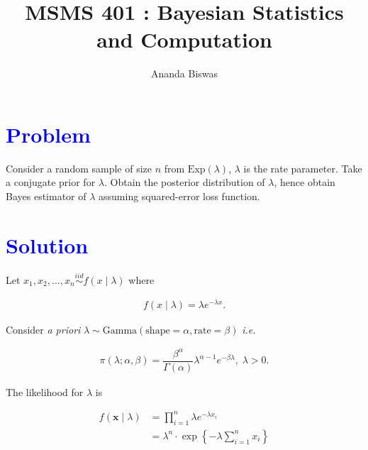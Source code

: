 \documentclass[12pt, a4paper]{article}
\title{MSMS 401 : Bayesian Statistics and Computation}
\author{{\fontsize{25}{20} \benyorithafont Ananda Biswas}}
\date{}
\begin{document}
\maketitle

\section*{\faArrowAltCircleRight[regular] \textcolor{blue}{Problem}}

Consider a random sample of size $n$ from $\text{Exp}(\lambda)$, $\lambda$ is the rate parameter. Take a conjugate prior for $\lambda$. Obtain the posterior distribution of $\lambda$, hence obtain Bayes estimator of $\lambda$ assuming squared-error loss function.

\section*{\faArrowAltCircleRight[regular] \textcolor{blue}{Solution}}

Let $x_1, x_2, \ldots, x_n \overset{iid}{\sim} f(x \mid \lambda)$ where

\begin{align*}
f(x \mid \lambda) = \lambda e^{-\lambda x}.
\end{align*}

Consider \textit{a priori} $\lambda \sim \text{Gamma}\left( \text{shape} = \alpha, \text{rate} = \beta \right)$ \textit{i.e.}

\begin{align*}
\pi(\lambda; \alpha, \beta) = \dfrac{\beta^\alpha}{\Gamma(\alpha)} \lambda^{\alpha-1}e^{-\beta\lambda}, \; \lambda > 0.
\end{align*}

The likelihood for $\lambda$ is

\begin{align*}
f(\mathbf{x} \mid \lambda) &= \prod \limits_{i = 1}^{n} \lambda e^{-\lambda x_i} \\[1em]
&= \lambda^n \cdot \exp \left\{ - \lambda \sum \limits_{i = 1}^{n} x_i \right\}
\end{align*}
\end{document}
